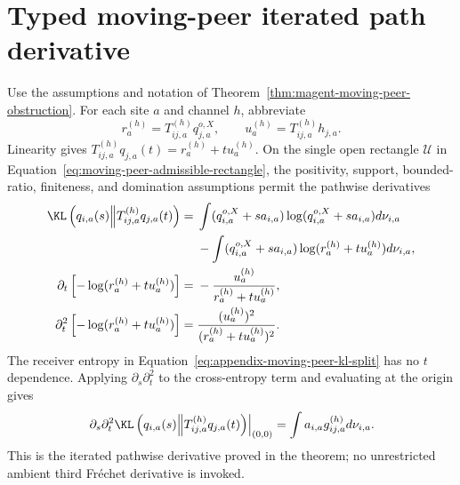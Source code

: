 \section{Typed moving-peer iterated path derivative}
\label{sec:moving-peer-calculus-oracle}

Use the assumptions and notation of Theorem~\ref{thm:magent-moving-peer-obstruction}. For each site \(a\) and channel \(h\), abbreviate
\begin{equation}
r_a^{(h)}=T_{ij,a}^{(h)}q_{j,a}^{o,X},
\qquad
u_a^{(h)}=T_{ij,a}^{(h)}h_{j,a}.
\label{eq:appendix-moving-peer-paths}
\end{equation}
Linearity gives \(T_{ij,a}^{(h)}q_{j,a}(t)=r_a^{(h)}+t u_a^{(h)}\). On the single open rectangle \(\mathcal U\) in Equation~\eqref{eq:moving-peer-admissible-rectangle}, the positivity, support, bounded-ratio, finiteness, and domination assumptions permit the pathwise derivatives
\begin{align}
\KL\left(q_{i,a}(s)\middle\Vert
T_{ij,a}^{(h)}q_{j,a}(t)\right)
={}&\int(q_{i,a}^{o,X}+s a_{i,a})
\log(q_{i,a}^{o,X}+s a_{i,a})d\nu_{i,a}
\notag\\
&-\int(q_{i,a}^{o,X}+s a_{i,a})
\log(r_a^{(h)}+t u_a^{(h)})d\nu_{i,a},
\label{eq:appendix-moving-peer-kl-split}\\
\partial_t\left[-\log(r_a^{(h)}+t u_a^{(h)})\right]
={}&-\frac{u_a^{(h)}}{r_a^{(h)}+t u_a^{(h)}},
\label{eq:appendix-moving-peer-first-sender}\\
\partial_t^2\left[-\log(r_a^{(h)}+t u_a^{(h)})\right]
={}&\frac{(u_a^{(h)})^2}
{(r_a^{(h)}+t u_a^{(h)})^2}.
\label{eq:appendix-moving-peer-second-sender}
\end{align}
The receiver entropy in Equation~\eqref{eq:appendix-moving-peer-kl-split} has no \(t\) dependence. Applying \(\partial_s\partial_t^2\) to the cross-entropy term and evaluating at the origin gives
\begin{equation}
\left.\partial_s\partial_t^2
\KL\left(q_{i,a}(s)\middle\Vert
T_{ij,a}^{(h)}q_{j,a}(t)\right)\right|_{(0,0)}
=\int a_{i,a}g_{ij,a}^{(h)}d\nu_{i,a}.
\label{eq:appendix-moving-peer-third-variation}
\end{equation}
This is the iterated pathwise derivative proved in the theorem; no unrestricted ambient third Fr\'echet derivative is invoked.


